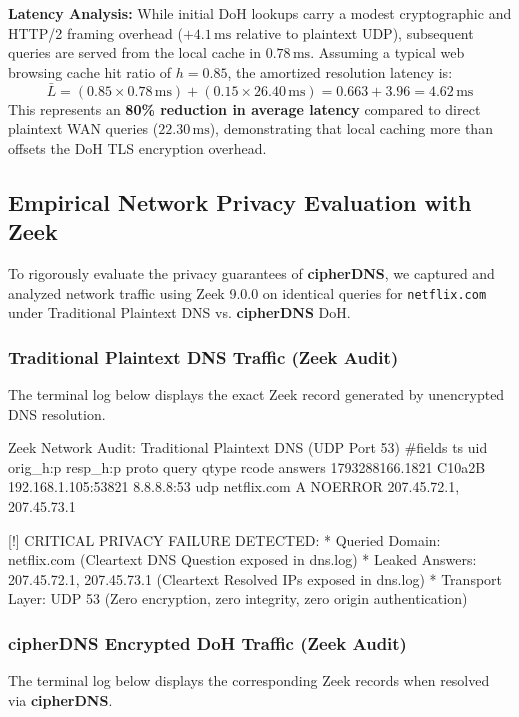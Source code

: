 \documentclass[10pt,a4paper]{article}
\begin{document}
\noindent\textbf{Latency Analysis:} While initial DoH lookups carry a modest cryptographic and HTTP/2 framing overhead ($+4.1\,\text{ms}$ relative to plaintext UDP), subsequent queries are served from the local cache in $0.78\,\text{ms}$. Assuming a typical web browsing cache hit ratio of $h = 0.85$, the amortized resolution latency is:
\begin{equation}
    \bar{L} = (0.85 \times 0.78\,\text{ms}) + (0.15 \times 26.40\,\text{ms}) = 0.663 + 3.96 = 4.62\,\text{ms}
\end{equation}
This represents an \textbf{80\% reduction in average latency} compared to direct plaintext WAN queries ($22.30\,\text{ms}$), demonstrating that local caching more than offsets the DoH TLS encryption overhead.

\subsection{Empirical Network Privacy Evaluation with Zeek}
To rigorously evaluate the privacy guarantees of \textbf{cipherDNS}, we captured and analyzed network traffic using Zeek 9.0.0 on identical queries for \texttt{netflix.com} under Traditional Plaintext DNS vs. \textbf{cipherDNS} DoH.

\subsubsection{Traditional Plaintext DNS Traffic (Zeek Audit)}
The terminal log below displays the exact Zeek record generated by unencrypted DNS resolution.

\begin{terminallog}{Zeek Network Audit: Traditional Plaintext DNS (UDP Port 53)}
#fields  ts               uid     orig_h:p               resp_h:p    proto  query        qtype  rcode    answers
         1793288166.1821  C10a2B  192.168.1.105:53821    8.8.8.8:53  udp    netflix.com  A      NOERROR  207.45.72.1, 207.45.73.1

[!] CRITICAL PRIVACY FAILURE DETECTED:
    * Queried Domain:   netflix.com (Cleartext DNS Question exposed in dns.log)
    * Leaked Answers:   207.45.72.1, 207.45.73.1 (Cleartext Resolved IPs exposed in dns.log)
    * Transport Layer:  UDP 53 (Zero encryption, zero integrity, zero origin authentication)
\end{terminallog}

\subsubsection{cipherDNS Encrypted DoH Traffic (Zeek Audit)}
The terminal log below displays the corresponding Zeek records when resolved via \textbf{cipherDNS}.
\end{document}
